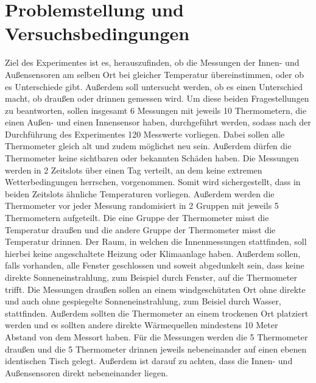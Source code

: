 \documentclass[ ngerman, fontsize= 12pt, paper=a4, headings=big, titlepage=true]{article}
\begin{document}
	\section{Problemstellung und Versuchsbedingungen}
	Ziel des Experimentes ist es, herauszufinden, ob die Messungen der Innen- und Außensensoren am selben Ort bei gleicher Temperatur übereinstimmen, oder ob es Unterschiede gibt. Außerdem soll untersucht werden, ob es einen Unterschied macht, ob draußen oder drinnen gemessen wird.\newline
	Um diese beiden Fragestellungen zu beantworten, sollen insgesamt 6 Messungen mit jeweils 10 Thermometern, die einen Außen- und einen Innensensor haben, durchgeführt werden, sodass nach der Durchführung des Experimentes 120 Messwerte vorliegen. Dabei sollen alle Thermometer gleich alt und zudem möglichst neu sein. Außerdem dürfen die Thermometer keine sichtbaren oder bekannten Schäden haben. Die Messungen werden in 2 Zeitslots über einen Tag verteilt, an dem keine extremen Wetterbedingungen herrschen, vorgenommen. Somit wird sichergestellt, dass in beiden Zeitslots ähnliche Temperaturen vorliegen. Außerdem werden die Thermometer vor jeder Messung randomisiert in 2 Gruppen mit jeweils 5 Thermometern aufgeteilt. Die eine Gruppe der Thermometer misst die Temperatur draußen und die andere Gruppe der Thermometer misst die Temperatur drinnen. Der Raum, in welchen die Innenmessungen stattfinden, soll hierbei keine angeschaltete Heizung oder Klimaanlage haben. Außerdem sollen, falls vorhanden, alle Fenster geschlossen und soweit abgedunkelt sein, dass keine direkte Sonneneinstrahlung, zum Beispiel durch Fenster, auf die Thermometer trifft. \newline
	Die Messungen draußen sollen an einem windgeschützten Ort ohne direkte und auch ohne gespiegelte Sonneneinstrahlung, zum Beisiel durch Wasser, stattfinden. Außerdem sollten die Thermometer an einem trockenen Ort platziert werden und es sollten andere direkte Wärmequellen mindestens 10 Meter Abstand von dem Messort haben. \newline
	Für die Messungen werden die 5 Thermometer draußen und die 5 Thermometer drinnen jeweils nebeneinander auf einen ebenen identischen Tisch gelegt. Außerdem ist darauf zu achten, dass die Innen- und Außensensoren direkt nebeneinander liegen.  \newline
\end{document}
